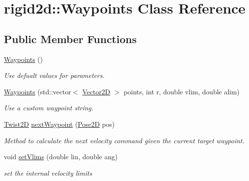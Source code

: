 \hypertarget{classrigid2d_1_1Waypoints}{}\section{rigid2d\+:\+:Waypoints Class Reference}
\label{classrigid2d_1_1Waypoints}
\subsection*{Public Member Functions}
\begin{DoxyCompactItemize}
\item 
\mbox{\label{classrigid2d_1_1Waypoints_a8e7579d65c588966c0f53866a73fee43}} 
\hyperlink{classrigid2d_1_1Waypoints_a8e7579d65c588966c0f53866a73fee43}{Waypoints} ()
\begin{DoxyCompactList}\small\item\em Use defualt values for parameters. \end{DoxyCompactList}\item 
\mbox{\label{classrigid2d_1_1Waypoints_a022820eb64ed86a33d3677f9880193fa}} 
\hyperlink{classrigid2d_1_1Waypoints_a022820eb64ed86a33d3677f9880193fa}{Waypoints} (std\+::vector$<$ \hyperlink{structrigid2d_1_1Vector2D}{Vector2D} $>$ points, int r, double vlim, double alim)
\begin{DoxyCompactList}\small\item\em Use a custom waypoint string. \end{DoxyCompactList}\item 
\hyperlink{structrigid2d_1_1Twist2D}{Twist2D} \hyperlink{classrigid2d_1_1Waypoints_acf263076e58543a95391476650f84c85}{next\+Waypoint} (\hyperlink{structrigid2d_1_1Pose2D}{Pose2D} pos)
\begin{DoxyCompactList}\small\item\em Method to calculate the next velocity command given the current target waypoint. \end{DoxyCompactList}\item 
void \hyperlink{classrigid2d_1_1Waypoints_a7ab69beb06eae9eb6f8c110748a6454f}{set\+Vlims} (double lin, double ang)
\begin{DoxyCompactList}\small\item\em set the internal velocity limits \end{DoxyCompactList}\item 

\end{DoxyCompactItemize}
